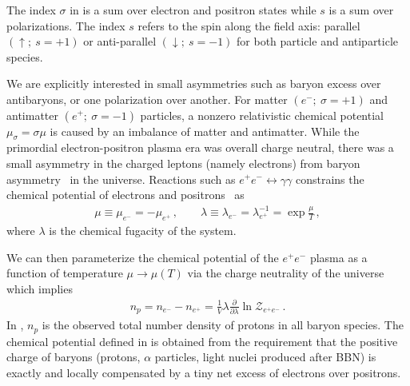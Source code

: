 

The index $\sigma$ in  is a sum over electron and positron states while $s$ is a sum over polarizations. The index $s$ refers to the spin along the field axis: parallel $(\uparrow;\ s=+1)$ or anti-parallel $(\downarrow;\ s=-1)$ for both particle and antiparticle species.

We are explicitly interested in small asymmetries such as baryon excess over antibaryons, or one polarization over another. For matter $(e^{-};\ \sigma=+1)$ and antimatter $(e^{+};\ \sigma=-1)$ particles, a nonzero relativistic chemical potential $\mu_{\sigma}=\sigma\mu$ is caused by an imbalance of matter and antimatter. While the primordial electron-positron plasma era was overall charge neutral, there was a small asymmetry in the charged leptons (namely electrons) from baryon asymmetry~\citep{Fromerth:2012fe,Canetti:2012zc} in the universe. Reactions such as $e^{+}e^{-}\leftrightarrow\gamma\gamma$ constrains the chemical potential of electrons and positrons~\citep{Elze:1980er} as 
\begin{align}
 \label{cpotential}
 \mu\equiv\mu_{e^{-}}=-\mu_{e^{+}}\,,\qquad
 \lambda\equiv\lambda_{e^{-}}=\lambda_{e^{+}}^{-1}=\exp\frac{\mu}{T}\,,
\end{align}
where $\lambda$ is the chemical fugacity of the system.

We can then parameterize the chemical potential of the $e^{+}e^{-}$ plasma as a function of temperature $\mu\rightarrow\mu(T)$ via the charge neutrality of the universe which implies
\begin{align}
 \label{chargeneutrality}
 n_{p}=n_{e^{-}}-n_{e^{+}}=\frac{1}{V}\lambda\frac{\partial}{\partial\lambda}\ln\mathcal{Z}_{e^{+}e^{-}}\,.
\end{align}
In , $n_{p}$ is the observed total number density of protons in all baryon species. The chemical potential defined in  is obtained from the requirement that the positive charge of baryons (protons, $\alpha$ particles, light nuclei produced after BBN) is exactly and locally compensated by a tiny net excess of electrons over positrons.

